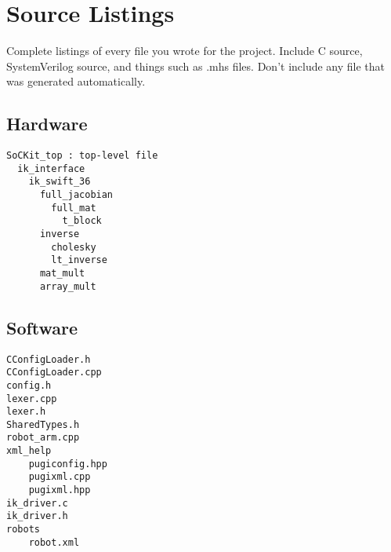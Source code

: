 \section{Source Listings}
Complete listings of every file you wrote for the project. Include C source, SystemVerilog source, and things such as .mhs files. Don't include any file that was generated automatically.

\subsection{Hardware}
\begin{verbatim}
SoCKit_top : top-level file
  ik_interface
    ik_swift_36
      full_jacobian
        full_mat
          t_block
      inverse
        cholesky
        lt_inverse
      mat_mult
      array_mult
\end{verbatim}

\subsection{Software}
\begin{verbatim}
CConfigLoader.h
CConfigLoader.cpp
config.h
lexer.cpp
lexer.h
SharedTypes.h
robot_arm.cpp
xml_help
	pugiconfig.hpp
	pugixml.cpp
	pugixml.hpp
ik_driver.c
ik_driver.h
robots
	robot.xml
\end{verbatim}

